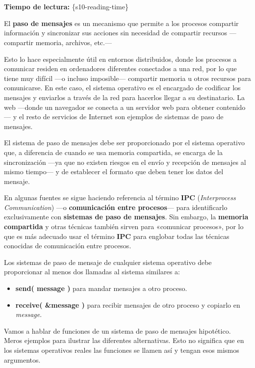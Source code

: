 \section{}

\textbf{Tiempo de lectura:} \{s10-reading-time\}

El \textbf{{}paso de mensajes} es un mecanismo que permite a los
procesos compartir información y sincronizar sus acciones sin necesidad
de compartir recursos ---compartir memoria, archivos, etc.---

Esto lo hace especialmente útil en entornos distribuidos, donde los
procesos a comunicar residen en ordenadores diferentes conectados a una
red, por lo que tiene muy difícil ---o incluso imposible--- compartir
memoria u otros recursos para comunicarse. En este caso, el sistema
operativo es el encargado de codificar los mensajes y enviarlos a través
de la red para hacerlos llegar a su destinatario. La web ---donde un
navegador se conecta a un servidor web para obtener contenido--- y el
resto de servicios de Internet son ejemplos de sistemas de paso de
mensajes.

El sistema de paso de mensajes debe ser proporcionado por el sistema
operativo que, a diferencia de cuando se usa memoria compartida, se
encarga de la sincronización ---ya que no existen riesgos en el envío y
recepción de mensajes al mismo tiempo--- y de establecer el formato que
deben tener los datos del mensaje.

En algunas fuentes se sigue haciendo referencia al término
\textbf{{}IPC} (\emph{Interprocess Communication}) ---o
\textbf{comunicación entre procesos}--- para identificarlo
exclusivamente con \textbf{sistemas de paso de mensajes}. Sin embargo,
la \textbf{memoria compartida} y otras técnicas también sirven para
«comunicar procesos», por lo que es más adecuado usar el término
\textbf{IPC} para englobar todas las técnicas conocidas de comunicación
entre procesos.

Los sistemas de paso de mensaje de cualquier sistema operativo debe
proporcionar al menos dos llamadas al sistema similares a:

\begin{itemize}
\item
  \textbf{send( message )} para mandar mensajes a otro proceso.
\item
  \textbf{receive( \&message )} para recibir mensajes de otro proceso y
  copiarlo en \emph{message}.
\end{itemize}

Vamos a hablar de funciones de un sistema de paso de mensajes
hipotético. Meros ejemplos para ilustrar las diferentes alternativas.
Esto no significa que en los sistemas operativos reales las funciones se
llamen así y tengan esos mismos argumentos.

